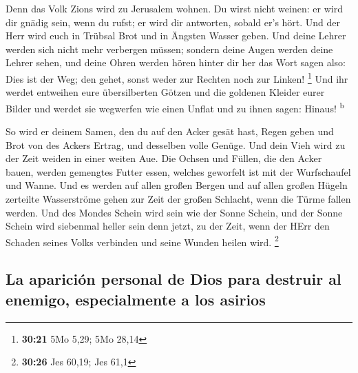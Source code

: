  Denn das Volk Zions wird zu Jerusalem wohnen. Du wirst
nicht weinen: er wird dir gnädig sein, wenn du rufst; er wird dir
antworten, sobald er's hört.  Und der Herr wird euch in
Trübsal Brot und in Ängsten Wasser geben. Und deine Lehrer werden sich
nicht mehr verbergen müssen; sondern deine Augen werden deine Lehrer
sehen,  und deine Ohren werden hören hinter dir her das
Wort sagen also: Dies ist der Weg; den gehet, sonst weder zur Rechten
noch zur Linken! \footnote{\textbf{30:21} 5Mo 5,29; 5Mo 28,14}
 Und ihr werdet entweihen eure übersilberten Götzen und
die goldenen Kleider eurer Bilder und werdet sie wegwerfen wie einen
Unflat und zu ihnen sagen: Hinaus! \textsuperscript{b}

 So wird er deinem Samen, den du auf den Acker gesät
hast, Regen geben und Brot von des Ackers Ertrag, und desselben volle
Genüge. Und dein Vieh wird zu der Zeit weiden in einer weiten Aue.
 Die Ochsen und Füllen, die den Acker bauen, werden
gemengtes Futter essen, welches geworfelt ist mit der Wurfschaufel und
Wanne.  Und es werden auf allen großen Bergen und auf
allen großen Hügeln zerteilte Wasserströme gehen zur Zeit der großen
Schlacht, wenn die Türme fallen werden.  Und des Mondes
Schein wird sein wie der Sonne Schein, und der Sonne Schein wird
siebenmal heller sein denn jetzt, zu der Zeit, wenn der HErr den Schaden
seines Volks verbinden und seine Wunden heilen wird. \footnote{\textbf{30:26}
  Jes 60,19; Jes 61,1}

\hypertarget{la-apariciuxf3n-personal-de-dios-para-destruir-al-enemigo-especialmente-a-los-asirios}{%
\subsection{La aparición personal de Dios para destruir al enemigo,
especialmente a los
asirios}\label{la-apariciuxf3n-personal-de-dios-para-destruir-al-enemigo-especialmente-a-los-asirios}}

